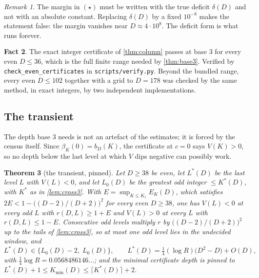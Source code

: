 \documentclass[11pt]{amsart}
\newtheorem{theorem}{Theorem}[section]
\theoremstyle{definition}
\newtheorem{fact}[theorem]{Fact}
\theoremstyle{remark}
\newtheorem{remark}[theorem]{Remark}
\begin{document}
\begin{remark}
\label{rem:star}
The margin in $(\star)$ must be written with the true deficit $\delta(D)$ and not with an absolute constant. Replacing $\delta(D)$ by a fixed $10^{-8}$ makes the statement false: the margin vanishes near $D \approx 4\cdot 10^{8}$. The deficit form is what runs forever.
\end{remark}

\begin{fact}
\label{fact:cert3}
The exact integer certificate of \cref{thm:column} passes at base $3$ for every even $D \le 36$, which is the full finite range needed by \cref{thm:base3}. Verified by \texttt{check\_even\_certificates} in \texttt{scripts/verify.py}. Beyond the bundled range, every even $D \le 102$ together with a grid to $D = 178$ was checked by the same method, in exact integers, by two independent implementations.
\end{fact}

\subsection*{The transient}

The depth base $3$ needs is not an artefact of the estimates; it is forced by the census itself. Since $\beta_K(0) = b_D(K)$, the certificate at $c = 0$ says $V(K) > 0$, so no depth below the last level at which $V$ dips negative can possibly work.

\begin{theorem}[the transient, pinned]
\label{thm:transient}
Let $D \ge 38$ be even, let $L^{*}(D)$ be the last level $L$ with $V(L) < 0$, and let $L_0(D)$ be the greatest odd integer $\le K^{*}(D)$, with $K^{*}$ as in \cref{lem:cross3}. With $E = \sup_{K \le K_1}E_K(D)$, which satisfies $2E < 1 - \bigl((D-2)/(D+2)\bigr)^2$ for every even $D \ge 38$, one has $V(L) < 0$ at every odd $L$ with $r(D,L) \ge 1 + E$ and $V(L) > 0$ at every $L$ with $r(D,L) \le 1 - E$. Consecutive odd levels multiply $r$ by $\bigl((D-2)/(D+2)\bigr)^2$ up to the tails of \cref{lem:cross3}, so at most one odd level lies in the undecided window, and
\[
  L^{*}(D) \in \{L_0(D) - 2,\; L_0(D)\}, \qquad
  L^{*}(D) = \tfrac14(\log R)\bigl(D^2 - D\bigr) + O(D),
\]
with $\tfrac14\log R = 0.0568486146\ldots$; and the minimal certificate depth is pinned to $L^{*}(D) + 1 \le K_{\min}(D) \le \lceil K^{*}(D)\rceil + 2$.
\end{theorem}
\end{document}
